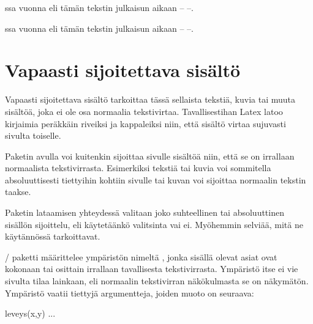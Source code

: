 \begin{koodilohkosis}
ssa vuonna 
eli tämän tekstin julkaisun aikaan -- --.
\end{koodilohkosis}

\begin{tulossis}
  ssa vuonna 
  eli tämän tekstin julkaisun aikaan -- --.
\end{tulossis}

\section{Vapaasti sijoitettava sisältö}

Vapaasti sijoitettava sisältö tarkoittaa tässä sellaista tekstiä, kuvia
tai muuta sisältöä, joka ei ole osa normaalia tekstivirtaa.
Tavallisestihan Latex latoo kirjaimia peräkkäin riveiksi ja kappaleiksi
niin, että sisältö virtaa sujuvasti sivulta toiselle.

Paketin  avulla voi kuitenkin sijoittaa sivulle
sisältöä niin, että se on irrallaan normaalista tekstivirrasta.
Esimerkiksi tekstiä tai kuvia voi sommitella absoluuttisesti tiettyihin
kohtiin sivulle tai kuvan voi sijoittaa normaalin tekstin taakse.

Paketin lataamisen yhteydessä valitaan joko suhteellinen tai
absoluuttinen sisällön sijoittelu, eli käytetäänkö valitsinta
 vai ei. Myöhemmin selviää, mitä ne käytännössä
tarkoittavat.

\begin{koodilohkosis}
\usepackage{textpos}            %
\usepackage[absolute]{textpos}  %
\end{koodilohkosis}

\noindent
{}\-/ paketti määrittelee ympäristön nimeltä
, jonka sisällä olevat asiat ovat kokonaan tai
osittain irrallaan tavallisesta tekstivirrasta. Ympäristö itse ei vie
sivulta tilaa lainkaan, eli normaalin tekstivirran näkökulmasta se on
näkymätön. Ympäristö vaatii tiettyjä argumentteja, joiden muoto on
seuraava:

\begin{koodilohkosis}
\begin{textblock}{leveys}(x,y)
  ...
\end{textblock}
\end{koodilohkosis}

